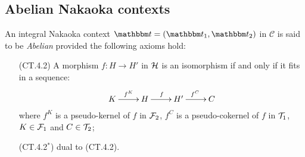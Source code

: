 \subsection{Abelian Nakaoka contexts}


\begin{definition}
An integral Nakaoka context $\t=(\t_1,\t_2)$ in $\mathscr{C}$ is said to be \emph{Abelian} provided the following axioms hold:
\begin{enumerate}
\item[(CT.4.2)] A morphism $f\colon H\to H'$ in $\mathcal{H}$ is an isomorphism if and only if it fits in a sequence:
\[
\xymatrix{
K\ar[r]^{f^K}&H\ar[r]^f&H'\ar[r]^{f^C}&C
}
\]
where $f^K$ is a pseudo-kernel of $f$ in $\mathcal{F}_2$, $f^C$ is a pseudo-cokernel of $f$ in $\mathcal{T}_1$, $K\in \mathcal{F}_1$ and $C\in \mathcal{T}_2$;
\item[(CT.4.2$^*$)] dual to (CT.4.2).
\end{enumerate}
\end{definition}


